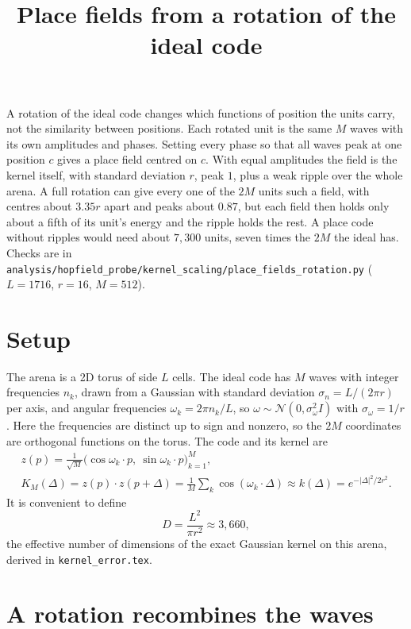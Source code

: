 \documentclass[11pt]{article}
\title{Place fields from a rotation of the ideal code}
\author{}
\date{}
\begin{document}
\maketitle

\noindent A rotation of the ideal code changes which functions of position the units carry, not
the similarity between positions. Each rotated unit is the same $M$ waves with its own amplitudes
and phases. Setting every phase so that all waves peak at one position $c$ gives a place field
centred on $c$. With equal amplitudes the field is the kernel itself, with standard deviation $r$,
peak $1$, plus a weak ripple over the whole arena. A full rotation can give every one of the $2M$
units such a field, with centres about $3.35r$ apart and peaks about $0.87$, but each field then
holds only about a fifth of its unit's energy and the ripple holds the rest. A place code without
ripples would need about $7{,}300$ units, seven times the $2M$ the ideal has. Checks are in
\texttt{analysis/hopfield\_probe/kernel\_scaling/place\_fields\_rotation.py}
($L = 1716$, $r = 16$, $M = 512$).

\section{Setup}

The arena is a 2D torus of side $L$ cells. The ideal code has $M$ waves with integer frequencies
$n_k$, drawn from a Gaussian with standard deviation $\sigma_n = L/(2\pi r)$ per axis, and angular
frequencies $\omega_k = 2\pi n_k/L$, so $\omega \sim \mathcal{N}(0, \sigma_\omega^2 I)$ with
$\sigma_\omega = 1/r$. Here the frequencies are distinct up to sign and nonzero, so the $2M$
coordinates are orthogonal functions on the torus. The code and its kernel are
\begin{gather}
  z(p) = \frac{1}{\sqrt M}\bigl(\cos\omega_k\!\cdot p,\ \sin\omega_k\!\cdot p\bigr)_{k=1}^M, \\
  K_M(\Delta) = z(p)\cdot z(p+\Delta) = \frac1M\sum_k \cos(\omega_k\!\cdot\Delta) \approx
  k(\Delta) = e^{-|\Delta|^2/2r^2}.
\end{gather}
It is convenient to define
\begin{equation}
  D = \frac{L^2}{\pi r^2} \approx 3{,}660,
\end{equation}
the effective number of dimensions of the exact Gaussian kernel on this arena, derived in
\texttt{kernel\_error.tex}.

\section{A rotation recombines the waves}
\end{document}
